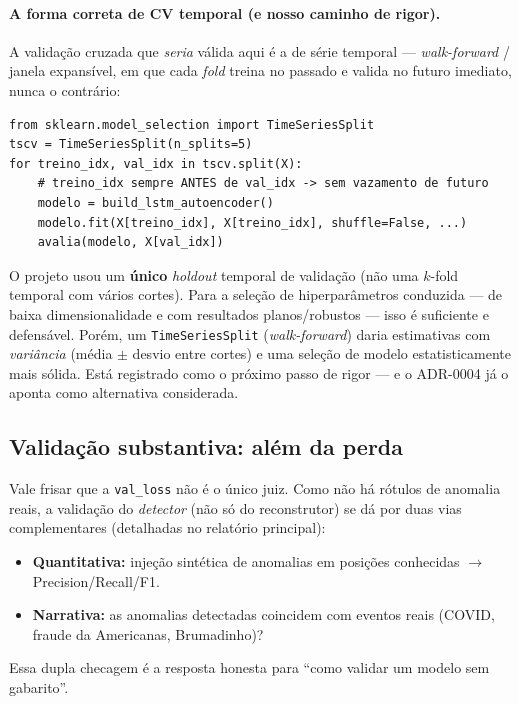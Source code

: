 \paragraph{A forma correta de CV temporal (e nosso caminho de rigor).}
A validação cruzada que \emph{seria} válida aqui é a de série temporal ---
\emph{walk-forward} / janela expansível, em que cada \emph{fold} treina no
passado e valida no futuro imediato, nunca o contrário:

\begin{lstlisting}[caption={Validação cruzada temporal (walk-forward) com scikit-learn.}]
from sklearn.model_selection import TimeSeriesSplit
tscv = TimeSeriesSplit(n_splits=5)
for treino_idx, val_idx in tscv.split(X):
    # treino_idx sempre ANTES de val_idx -> sem vazamento de futuro
    modelo = build_lstm_autoencoder()
    modelo.fit(X[treino_idx], X[treino_idx], shuffle=False, ...)
    avalia(modelo, X[val_idx])
\end{lstlisting}

\begin{honesto}
O projeto usou um \textbf{único} \emph{holdout} temporal de validação (não uma
$k$-fold temporal com vários cortes). Para a seleção de hiperparâmetros conduzida
--- de baixa dimensionalidade e com resultados planos/robustos --- isso é
suficiente e defensável. Porém, um \texttt{TimeSeriesSplit} (\emph{walk-forward})
daria estimativas com \emph{variância} (média $\pm$ desvio entre cortes) e uma
seleção de modelo estatisticamente mais sólida. Está registrado como o próximo
passo de rigor --- e o ADR-0004 já o aponta como alternativa considerada.
\end{honesto}

\subsection{Validação substantiva: além da perda}
Vale frisar que a \texttt{val\_loss} não é o único juiz. Como não há rótulos de
anomalia reais, a validação do \emph{detector} (não só do reconstrutor) se dá por
duas vias complementares (detalhadas no relatório principal):
\begin{itemize}[noitemsep]
  \item \textbf{Quantitativa:} injeção sintética de anomalias em posições
        conhecidas $\to$ Precision/Recall/F1.
  \item \textbf{Narrativa:} as anomalias detectadas coincidem com eventos reais
        (COVID, fraude da Americanas, Brumadinho)?
\end{itemize}
Essa dupla checagem é a resposta honesta para ``como validar um modelo sem
gabarito''.
